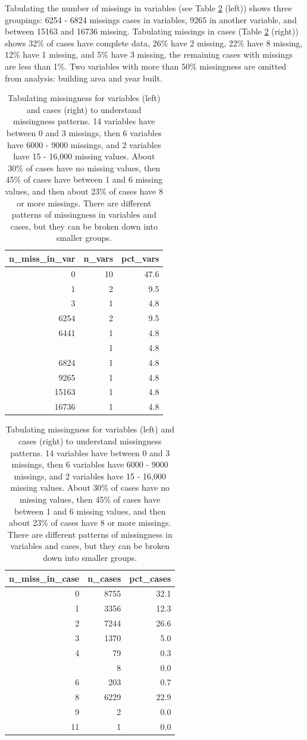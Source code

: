 \documentclass[]{article}
\theoremstyle{definition}
\theoremstyle{definition}
\theoremstyle{definition}
\theoremstyle{remark}
\begin{document}
Tabulating the number of missings in variables (see Table
\ref{tab:housing-miss-var-case-table} (left)) shows three groupings:
6254 - 6824 missings cases in variables, 9265 in another variable, and
between 15163 and 16736 missing. Tabulating missings in cases (Table
\ref{tab:housing-miss-var-case-table} (right)) shows 32\% of cases have
complete data, 26\% have 2 missing, 22\% have 8 missing, 12\% have 1
missing, and 5\% have 3 missing, the remaining cases with missings are
less than 1\%. Two variables with more than 50\% missingness are omitted
from analysis: building area and year built.

\begin{table}[!h]
\caption{\label{tab:housing-miss-var-case-table}Tabulating missingness for variables (left) and cases (right) to understand missingness patterns. 14 variables have between 0 and 3 missings, then 6 variables have 6000 - 9000 missings, and 2 variables have 15 - 16,000 missing values. About 30\% of cases have no missing values, then 45\% of cases have between 1 and 6 missing values, and then about 23\% of cases have 8 or more missings. There are different patterns of missingness in variables and cases, but they can be broken down into smaller groups.}

\centering
\begin{tabular}[t]{rrr}
\toprule
n\_miss\_in\_var & n\_vars & pct\_vars\\
\midrule
0 & 10 & 47.6\\
1 & 2 & 9.5\\
3 & 1 & 4.8\\
6254 & 2 & 9.5\\
6441 & 1 & 4.8\\
\addlinespace
6447 & 1 & 4.8\\
6824 & 1 & 4.8\\
9265 & 1 & 4.8\\
15163 & 1 & 4.8\\
16736 & 1 & 4.8\\
\bottomrule
\end{tabular}
\centering
\begin{tabular}[t]{rrr}
\toprule
n\_miss\_in\_case & n\_cases & pct\_cases\\
\midrule
0 & 8755 & 32.1\\
1 & 3356 & 12.3\\
2 & 7244 & 26.6\\
3 & 1370 & 5.0\\
4 & 79 & 0.3\\
\addlinespace
5 & 8 & 0.0\\
6 & 203 & 0.7\\
8 & 6229 & 22.9\\
9 & 2 & 0.0\\
11 & 1 & 0.0\\
\bottomrule
\end{tabular}
\end{table}
\end{document}
